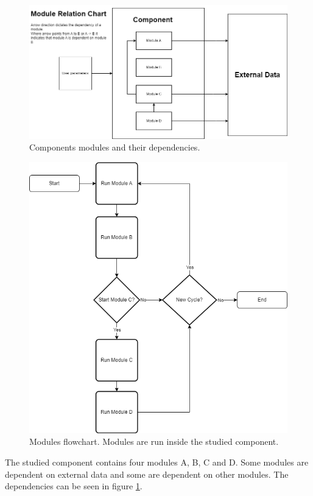 \begin{figure}
    \includegraphics[width=\textwidth]{images/modules_relation_uml.png}
    \caption{Components modules and their dependencies.}
    \label{figure:module:relation}
\end{figure}
\begin{figure}
    \includegraphics[width=\textwidth]{images/module_flow_chart.png}
    \caption{Modules flowchart. Modules are run inside the studied component.}
    \label{figure:module:flow}
\end{figure}

The studied component contains four modules A, B, C and D.
Some modules are dependent on external data and some are dependent on other modules.
The dependencies can be seen in figure \ref{figure:module:relation}.

